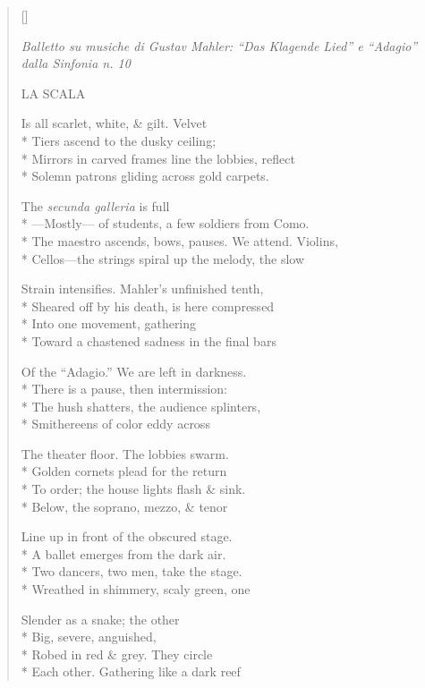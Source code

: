 \label{ch:milano_la_scala}
\settowidth{\versewidth}{The maestro ascends, bows, pauses. We attend.  Violins,}
\begin{verse}[\versewidth]
\epigraph{\textit{Balletto su musiche di Gustav Mahler: ``Das Klagende Lied'' e ``Adagio'' dalla Sinfonia n. 10}}{}

LA SCALA

Is all scarlet, white, \& gilt. Velvet\\*
Tiers ascend to the dusky ceiling;\\*
Mirrors in carved frames line the lobbies, reflect\\*
Solemn patrons gliding across gold carpets.

The \textit{secunda galleria} is full\\*
---Mostly--- of students, a few soldiers from Como.\\*
The maestro ascends, bows, pauses. We attend.  Violins,\\*
Cellos---the strings spiral up the melody, the slow

Strain intensifies.  Mahler's unfinished tenth,\\*
Sheared off by his death, is here compressed\\*
Into one movement, gathering\\*
Toward a chastened sadness in the final bars

Of the ``Adagio.'' We are left in darkness.\\*
There is a pause, then intermission:\\*
The hush shatters, the audience splinters,\\*
Smithereens of color eddy across

The theater floor.  The lobbies swarm.\\*
Golden cornets plead for the return\\*
To order; the house lights flash \& sink.\\*
Below, the soprano, mezzo, \& tenor

Line up in front of the obscured stage.\\*
A ballet emerges from the dark air.\\*
Two dancers, two men, take the stage.\\*
Wreathed in shimmery, scaly green, one

Slender as a snake; the other\\*
Big, severe, anguished,\\*
Robed in red \& grey.   They circle\\*
Each other.  Gathering like a dark reef


\end{verse}
